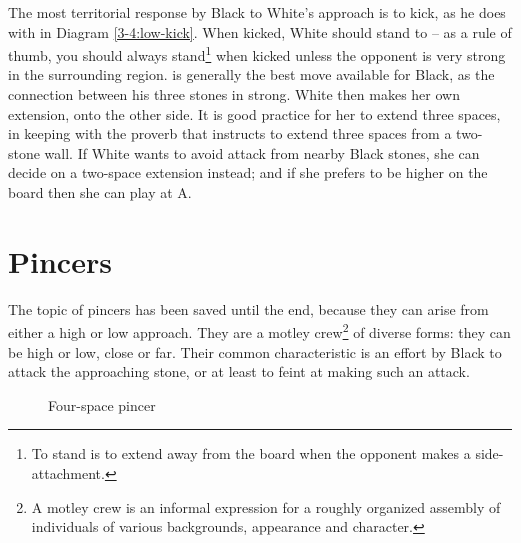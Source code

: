 \documentclass[a5paper,12pt,twoside]{book} %
\newcounter{joseki}                 %
\newcommand{\dref}[1]{Diagram \ref{#1}}
\newcommand{\addstufftotoc}[2][toc]{%
  \addtocontents{#1}{#2}}
\begin{document}
The most territorial response by Black to White's approach is to kick, as he does with{\large\blackstone[2]} in \dref{3-4:low-kick}. When kicked, White should stand to{\large\whitestone[3]} – as a rule of thumb, you should always stand\footnote{To stand is to extend away from the board when the opponent makes a side-attachment.} when kicked unless the opponent is very strong in the surrounding region.{\large\blackstone[4]} is generally the best move available for Black, as the connection between his three stones in strong. White then makes her own extension, onto the other side. It is good practice for her to extend three spaces, in keeping with the proverb that instructs to extend three spaces from a two-stone wall. If White wants to avoid attack from nearby Black stones, she can decide on a two-space extension instead; and if she prefers to be higher on the board then she can play at A.\\

\addstufftotoc{\nobreak\smallskip\protect\par}
\addstufftotoc{\nobreak\smallskip\protect\par}

\section{Pincers \label{sec:3-4:pincers}}

The topic of pincers has been saved until the end, because they can arise from either a high or low approach. They are a motley crew\footnote{A motley crew is an informal expression for a roughly organized assembly of individuals of various backgrounds, appearance and character.} of diverse forms: they can be high or low, close or far. Their common characteristic is an effort by Black to attack the approaching stone, or at least to feint at making such an attack.\\

\begin{figure}[!htbp]
 
\vspace{-0.6cm}\caption{Four-space pincer}
\label{3-4:pincer-4space}
\end{figure}

%
% 
%
%
% 
%
\end{document}
